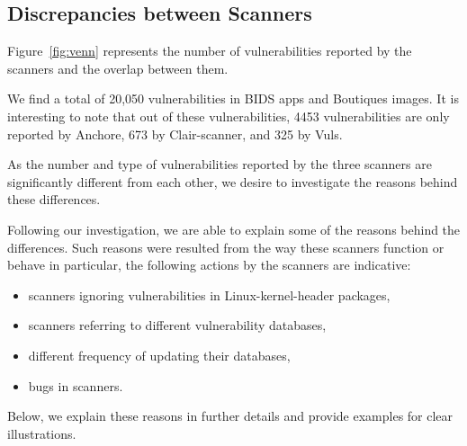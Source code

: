 \documentclass[a4paper,num-refs]{oup-contemporary}
\begin{document}

\subsection{Discrepancies between Scanners}

Figure~\ref{fig:venn} represents the number of vulnerabilities reported by
the scanners and the overlap between them.

We find a total of 20,050 vulnerabilities in BIDS apps and Boutiques images.
It is interesting to note that out of these vulnerabilities, 4453 vulnerabilities are only
reported by Anchore, 673 by Clair-scanner, and 325 by Vuls.

As the number and type of vulnerabilities reported by the three scanners are significantly different from each other,
we desire to investigate the reasons behind these differences.

Following our investigation, we are able to explain some of the reasons behind
the differences. 
Such reasons were resulted from the way these scanners function or behave 
in particular, the following actions by the scanners are indicative:
\begin{itemize}
   \item scanners ignoring vulnerabilities in Linux-kernel-header packages,
   \item scanners referring to different vulnerability databases,
   \item different frequency of updating their databases,
   \item bugs in scanners. 
\end{itemize}

Below, we explain these reasons in further details and provide examples
for clear illustrations.
%
\end{document}
